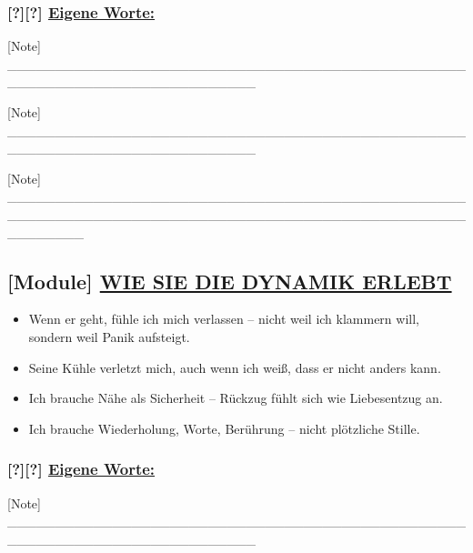 \hypertarget{eigene-worte}{%
\subsubsection{\texorpdfstring{[?][?] \textbf{\ul{Eigene Worte:}}}{[?][?] Eigene Worte:}}\label{eigene-worte}}

[Note] \_\_\_\_\_\_\_\_\_\_\_\_\_\_\_\_\_\_\_\_\_\_\_\_\_\_\_\_\_\_\_\_\_\_\_\_\_\_\_\_\_\_\_\_\_\_\_\_\_\_\_\_\_\_\_\_\_\_\_\_\_\_\_\_\_\_\_\_\_\_\_\_\_\_

[Note] \_\_\_\_\_\_\_\_\_\_\_\_\_\_\_\_\_\_\_\_\_\_\_\_\_\_\_\_\_\_\_\_\_\_\_\_\_\_\_\_\_\_\_\_\_\_\_\_\_\_\_\_\_\_\_\_\_\_\_\_\_\_\_\_\_\_\_\_\_\_\_\_\_\_

[Note] \_\_\_\_\_\_\_\_\_\_\_\_\_\_\_\_\_\_\_\_\_\_\_\_\_\_\_\_\_\_\_\_\_\_\_\_\_\_\_\_\_\_\_\_\_\_\_\_\_\_\_\_\_\_\_\_\_\_\_\_\_\_\_\_\_\_\_\_\_\_\_\_\_\_\_\_\_\_\_\_\_\_\_\_\_\_\_\_\_\_\_\_\_\_\_\_\_\_\_\_\_\_\_\_

\hypertarget{wie-sie-die-dynamik-erlebt}{%
\subsection{\texorpdfstring{[Module] \textbf{\ul{WIE SIE DIE DYNAMIK ERLEBT}}}{[Module] WIE SIE DIE DYNAMIK ERLEBT}}\label{wie-sie-die-dynamik-erlebt}}

\begin{itemize}
\tightlist
\item
  Wenn er geht, fühle ich mich verlassen -- nicht weil ich klammern will, sondern weil Panik aufsteigt.
\item
  Seine Kühle verletzt mich, auch wenn ich weiß, dass er nicht anders kann.
\item
  Ich brauche Nähe als Sicherheit -- Rückzug fühlt sich wie Liebesentzug an.
\item
  Ich brauche Wiederholung, Worte, Berührung -- nicht plötzliche Stille.
\end{itemize}

\hypertarget{eigene-worte-1}{%
\subsubsection{\texorpdfstring{[?][?] \textbf{\ul{Eigene Worte:}}}{[?][?] Eigene Worte:}}\label{eigene-worte-1}}

[Note] \_\_\_\_\_\_\_\_\_\_\_\_\_\_\_\_\_\_\_\_\_\_\_\_\_\_\_\_\_\_\_\_\_\_\_\_\_\_\_\_\_\_\_\_\_\_\_\_\_\_\_\_\_\_\_\_\_\_\_\_\_\_\_\_\_\_\_\_\_\_\_\_\_\_

